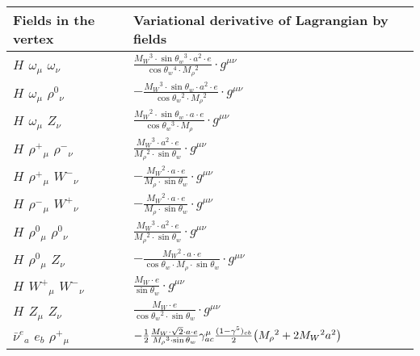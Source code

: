 \begin{center}
\begin{tabular}{|l|l|} \hline
Fields in the vertex & Variational derivative of Lagrangian by fields \\ \hline
${H}_{}$ \phantom{-} $\omega{}_{\mu }$ \phantom{-} $\omega{}_{\nu }$ \phantom{-}  &
	$\frac{ M_W{}^3  \cdot \sin{\theta}_w{}^3  \cdot a{}^2  \cdot e}{ \cos{\theta}_w{}^4  \cdot M_\rho{}^2 }\cdot g^{\mu \nu} $\\[2mm]
${H}_{}$ \phantom{-} $\omega{}_{\mu }$ \phantom{-} $\rho^0{}_{\nu }$ \phantom{-}  &
	$-\frac{ M_W{}^3  \cdot \sin{\theta}_w \cdot a{}^2  \cdot e}{ \cos{\theta}_w{}^2  \cdot M_\rho{}^2 }\cdot g^{\mu \nu} $\\[2mm]
${H}_{}$ \phantom{-} $\omega{}_{\mu }$ \phantom{-} ${Z}_{\nu }$ \phantom{-}  &
	$\frac{ M_W{}^2  \cdot \sin{\theta}_w \cdot a \cdot e}{ \cos{\theta}_w{}^3  \cdot M_\rho}\cdot g^{\mu \nu} $\\[2mm]
${H}_{}$ \phantom{-} $\rho^+{}_{\mu }$ \phantom{-} $\rho^-{}_{\nu }$ \phantom{-}  &
	$\frac{ M_W{}^3  \cdot a{}^2  \cdot e}{ M_\rho{}^2  \cdot \sin{\theta}_w}\cdot g^{\mu \nu} $\\[2mm]
${H}_{}$ \phantom{-} $\rho^+{}_{\mu }$ \phantom{-} $W^-{}_{\nu }$ \phantom{-}  &
	$-\frac{ M_W{}^2  \cdot a \cdot e}{ M_\rho \cdot \sin{\theta}_w}\cdot g^{\mu \nu} $\\[2mm]
${H}_{}$ \phantom{-} $\rho^-{}_{\mu }$ \phantom{-} $W^+{}_{\nu }$ \phantom{-}  &
	$-\frac{ M_W{}^2  \cdot a \cdot e}{ M_\rho \cdot \sin{\theta}_w}\cdot g^{\mu \nu} $\\[2mm]
${H}_{}$ \phantom{-} $\rho^0{}_{\mu }$ \phantom{-} $\rho^0{}_{\nu }$ \phantom{-}  &
	$\frac{ M_W{}^3  \cdot a{}^2  \cdot e}{ M_\rho{}^2  \cdot \sin{\theta}_w}\cdot g^{\mu \nu} $\\[2mm]
${H}_{}$ \phantom{-} $\rho^0{}_{\mu }$ \phantom{-} ${Z}_{\nu }$ \phantom{-}  &
	$-\frac{ M_W{}^2  \cdot a \cdot e}{ \cos{\theta}_w \cdot M_\rho \cdot \sin{\theta}_w}\cdot g^{\mu \nu} $\\[2mm]
${H}_{}$ \phantom{-} $W^+{}_{\mu }$ \phantom{-} $W^-{}_{\nu }$ \phantom{-}  &
	$\frac{ M_W \cdot e}{ \sin{\theta}_w}\cdot g^{\mu \nu} $\\[2mm]
${H}_{}$ \phantom{-} ${Z}_{\mu }$ \phantom{-} ${Z}_{\nu }$ \phantom{-}  &
	$\frac{ M_W \cdot e}{ \cos{\theta}_w{}^2  \cdot \sin{\theta}_w}\cdot g^{\mu \nu} $\\[2mm]
$\bar{\nu}^e{}_{a }$ \phantom{-} $e{}_{b }$ \phantom{-} $\rho^+{}_{\mu }$ \phantom{-}  &
	$-\frac{1}{2}\frac{ M_W \cdot\sqrt{2} \cdot a \cdot e}{ M_\rho{}^3  \cdot \sin{\theta}_w}\gamma_{a c}^\mu {(1-\gamma^5)_{c b}\over 2} \big( M_\rho{}^2 +2 M_W{}^2  a{}^2 \big)$\\[2mm]

\end{tabular}
\end{center}
